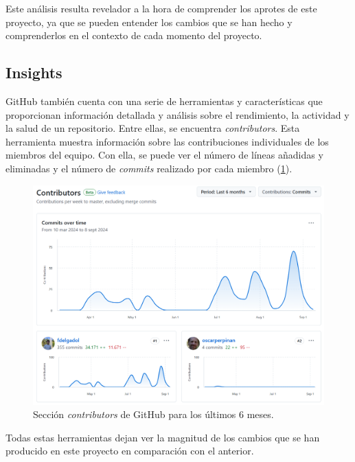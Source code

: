 Este análisis resulta revelador a la hora de comprender los aprotes de este proyecto, ya que se pueden entender los cambios que se han hecho y comprenderlos en el contexto de cada momento del proyecto.

\subsection{Insights}
\label{sec:org25cb851}
GitHub también cuenta con una serie de herramientas y características que proporcionan información detallada y análisis sobre el rendimiento, la actividad y la salud de un repositorio. Entre ellas, se encuentra \emph{contributors}. Esta herramienta muestra información sobre las contribuciones individuales de los miembros del equipo. Con ella, se puede ver el número de líneas añadidas y eliminadas y el número de \emph{commits} realizado por cada miembro (\ref{fig:contributors}).
\begin{figure}[htbp]
\centering
\includegraphics[width=.9\linewidth]{figuras/contributors.png}
\caption{Sección \emph{contributors} de GitHub para los últimos 6 meses. \label{fig:contributors}}
\end{figure}

Todas estas herramientas dejan ver la magnitud de los cambios que se han producido en este proyecto en comparación con el anterior.

